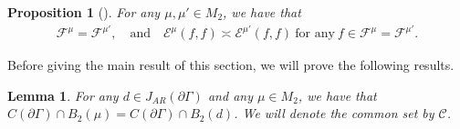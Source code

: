 \documentclass[10pt]{amsart}
\newtheorem{lemm}[theo]{Lemma}\newtheorem{prop}[theo]{Proposition}\newtheorem{coro}[theo]{Corollary}\newtheorem{conj}[theo]{Conjecture}
\theoremstyle{definition}\newtheorem{defi}[theo]{Definition}\newtheorem{rema}[theo]{Remark}\newtheorem{exam}[theo]{Example}\newtheorem{exem}[theo]{Example}\newtheorem{nota}[theo]{Notation}
\newcommand{\ce}{\mathcal{E}}
\newcommand{\cf}{\mathcal{F}}
\newcommand{\cC}{\mathcal{C}}
\begin{document}
\begin{prop}[{\cite[Lemma~2.1]{PSC}}]\label{psc}
For any $\mu,\mu'\in M_2$, we have that
\begin{align*}
\cf^{\mu}=\cf^{\mu'}, \quad\text{and}\quad \ce^{\mu}(f,f)\asymp\ce^{\mu'}(f,f)\ \text{for\ any}\ f\in\cf^{\mu}=\cf^{\mu'}.
\end{align*}
\end{prop}

Before giving the main result of this section, we will prove the following results.

\begin{lemm}\label{c}
For any $d\in J_{AR}(\partial\Gamma)$ and any $\mu\in M_2$, we have that $C(\partial \Gamma)\cap B_2(\mu)=C(\partial \Gamma)\cap B_2(d)$. We will denote the common set by $\cC$.
\end{lemm}
\end{document}
